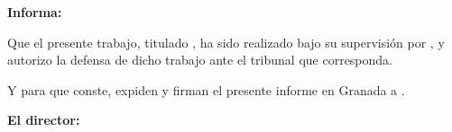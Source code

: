 \textbf{Informa:}

\vspace{0.5cm}

Que el presente trabajo, titulado \textit{\textbf{\myTitle}},
ha sido realizado bajo su supervisión por \textbf{\myName}, y autorizo la defensa de dicho trabajo ante el tribunal
que corresponda.

\vspace{0.5cm}

Y para que conste, expiden y firman el presente informe en Granada a \myTime.

\vspace{1cm}

\textbf{El director:}

\vspace{5cm}

\noindent \textbf{\myProf }
%
%



